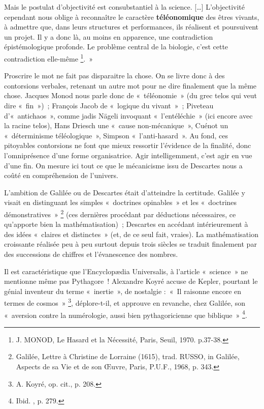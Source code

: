 \documentclass[a4paper,12pt]{article}
\begin{document}
Mais le postulat d’objectivité est consubstantiel à la science. […] L’objectivité cependant nous oblige à reconnaître le caractère \textbf{téléonomique} des êtres vivants, à admettre que, dans leurs structures et performances, ils réalisent et poursuivent un projet. Il y a donc là, au moins en apparence, une contradiction épistémologique profonde. Le problème central de la biologie, c’est cette contradiction elle-même \footnote{J. MONOD, Le Hasard et la Nécessité, Paris, Seuil, 1970. p.37-38.}. »

Proscrire le mot ne fait pas disparaitre la chose. On se livre donc à des contorsions verbales, retenant un autre mot pour ne dire finalement que la même chose. Jacques Monod nous parle donc de « téléonomie » (du grec telos qui veut dire « fin ») ; François Jacob de « logique du vivant » ; Piveteau d'« antichaos », comme jadis Nägeli invoquant « l'entéléchie » (ici encore avec la racine telos), Hans Driesch une « cause non-mécanique », Cuénot un « déterminisme téléologique », Simpson « l’anti-hasard ». Au fond, ces pitoyables contorsions ne font que mieux ressortir l'évidence de la finalité, donc l'omniprésence d'une forme organisatrice. Agir intelligemment, c'est agir en vue d'une fin. On mesure ici tout ce que le mécanicisme issu de Descartes nous a coûté en compréhension de l’univers.

	L'ambition de Galilée ou de Descartes était d'atteindre la certitude. Galilée y visait en distinguant les simples « doctrines opinables » et les « doctrines démonstratives » \footnote{Galilée, Lettre à Christine de Lorraine (1615), trad. RUSSO, in Galilée, Aspects de sa Vie et de son Œuvre, Paris, P.U.F., 1968, p. 343.} (ces dernières procédant par déductions nécessaires, ce qu'apporte bien la mathématisation) ; Descartes en accédant intérieurement à des idées « claires et distinctes » (et, de ce seul fait, vraies).
La mathématisation croissante réalisée peu à peu surtout depuis trois siècles se traduit finalement par des successions de chiffres et l’évanescence des nombres. 

Il est caractéristique que l’Encyclopædia Universalis, à l’article « science » ne mentionne même pas Pythagore ! Alexandre Koyré accuse de Kepler, pourtant le génial inventeur du terme « inertie », de nostalgie : « Il raisonne encore en termes de cosmos » \footnote{A. Koyré, op. cit., p. 208.}, déplore-t-il, et approuve en revanche, chez Galilée, son « aversion contre la numérologie, aussi bien pythagoricienne que biblique » \footnote{Ibid. , p. 279.}. 
\end{document}
